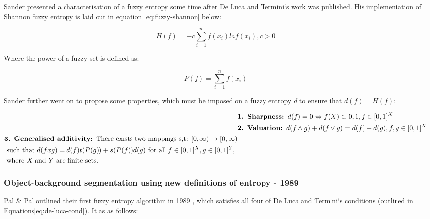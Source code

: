Sander \cite{Sander_1989} presented a characterisation of a fuzzy entropy some time after De Luca and Termini`s work was published. His implementation of Shannon fuzzy entropy is laid out in equation \eqref{eq:fuzzy-shannon} below:

\begin{equation}\label{eq:fuzzy-shannon}
  H(f) = -c \displaystyle\sum_{i=1}^{n}{f(x_i)lnf(x_i), c > 0}
\end{equation}

Where the power of a fuzzy set is defined as:

\begin{equation}
  P(f) = \displaystyle\sum_{i=1}^{n}{f (x_i)}
\end{equation}

Sander further went on to propose some properties, which must be imposed on a fuzzy entropy $d$ to ensure that $d(f) = H(f)$:

\begin{subequations}
  \begin{align}
    &\text{\textbf{1. Sharpness: }} d(f) = 0 \Leftrightarrow f(X) \subset {0,1}, f \in [0,1]^X \\
    &\text{\textbf{2. Valuation: }} d(f \wedge g) + d(f \vee g) = d(f) + d(g), f,g \in [0,1]^X \\
    \begin{split}
    &\text{\textbf{3. Generalised additivity: }} \text{There exists two mappings s,t: } [0,\infty) \rightarrow  [0,\infty) \\
      &\text{ such that } d(f x g) = d(f)t(P(g)) + s(P(f))d(g) \text{ for all } f \in [0,1]^X, g \in [0,1]^Y, \\
      &\text{ where } X \text{ and } Y \text{ are finite sets.}
    \end{split}
  \end{align}
\end{subequations}


\vspace{2cm}
\subsubsection{Object-background segmentation using new definitions of entropy - 1989}

Pal \& Pal outlined their first fuzzy entropy algorithm in 1989 \cite{Pal_Pal_1989}, which satisfies all four of De Luca and Termini`s conditions (outlined in Equations\eqref{eq:de-luca-cond}). It as as follows:

